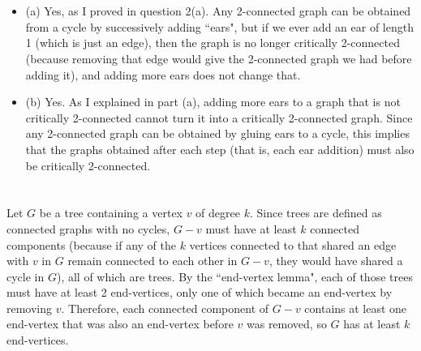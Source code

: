 \documentclass[12pt]{article}
\begin{document}
\section{}
\noindent{}\bigskip\par
\begin{itemize}
    \item (a) Yes, as I proved in question 2(a). Any 2-connected graph can be obtained from a cycle by successively adding ``ears", but if we ever add an ear of length 1 (which is just an edge), then the graph is no longer critically 2-connected (because removing that edge would give the 2-connected graph we had before adding it), and adding more ears does not change that.
    \item (b) Yes. As I explained in part (a), adding more ears to a graph that is not critically 2-connected cannot turn it into a critically 2-connected graph. Since any 2-connected graph can be obtained by gluing ears to a cycle, this implies that the graphs obtained after each step (that is, each ear addition) must also be critically 2-connected.
\end{itemize}

\section{}
\noindent{}\bigskip\par
Let $G$ be a tree containing a vertex $v$ of degree $k$. Since trees are defined as connected graphs with no cycles, $G-v$ must have at least $k$ connected components (because if any of the $k$ vertices connected to that shared an edge with $v$ in $G$ remain connected to each other in $G-v$, they would have shared a cycle in $G$), all of which are trees. By the ``end-vertex lemma", each of those trees must have at least 2 end-vertices, only one of which became an end-vertex by removing $v$. Therefore, each connected component of $G-v$ contains at least one end-vertex that was also an end-vertex before $v$ was removed, so $G$ has at least $k$ end-vertices.
\end{document}
